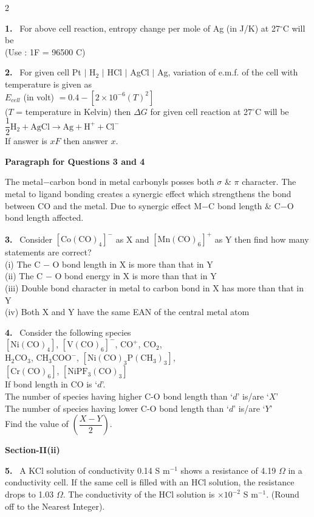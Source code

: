 \documentclass[10pt]{extarticle}
\newcommand{\sect}[1]{\par\smallskip\noindent\textbf{#1}\par}
\newcommand{\qn}[1]{\par\smallskip\noindent\textbf{#1.}~}
\newcommand{\paraq}[2]{\par\smallskip\noindent\textbf{Paragraph for Questions #1 and #2}\par}
\begin{document}
\begin{multicols}{2}
\qn{1} For above cell reaction, entropy change per mole of Ag (in J/K) at 27$^\circ$C will be\\
(Use : 1F = 96500 C)

\qn{2} For given cell Pt $|$ H$_2$ $|$ HCl $|$ AgCl $|$ Ag, variation of e.m.f. of the cell with temperature is given as\\
$E_{cell}$ (in volt) $=0.4-[2\times10^{-6}(T)^2]$\\
($T$ = temperature in Kelvin) then $\Delta G$ for given cell reaction at 27$^\circ$C will be\\
$\dfrac12\mathrm{H_2}+\mathrm{AgCl}\rightarrow\mathrm{Ag}+\mathrm{H^+}+\mathrm{Cl^-}$\\
If answer is $xF$ then answer $x$.

\paraq{3}{4}
The metal$-$carbon bond in metal carbonyls posses both $\sigma$ \& $\pi$ character. The metal to ligand bonding creates a synergic effect which strengthens the bond between CO and the metal. Due to synergic effect M$-$C bond length \& C$-$O bond length affected.

\qn{3} Consider $[\mathrm{Co(CO)_4}]^{-}$ as X and $[\mathrm{Mn(CO)_6}]^{+}$ as Y then find how many statements are correct?\\
(i) The C $-$ O bond length in X is more than that in Y\\
(ii) The C $-$ O bond energy in X is more than that in Y\\
(iii) Double bond character in metal to carbon bond in X has more than that in Y\\
(iv) Both X and Y have the same EAN of the central metal atom

\qn{4} Consider the following species\\
$[\mathrm{Ni(CO)_4}]$, $[\mathrm{V(CO)_6}]^{-}$, $\mathrm{CO^+}$, $\mathrm{CO_2}$,\\
$\mathrm{H_2CO_3}$, $\mathrm{CH_3COO^-}$, $[\mathrm{Ni(CO)_3P(CH_3)_3}]$,\\
$[\mathrm{Cr(CO)_6}]$, $[\mathrm{NiPF_3(CO)_3}]$\\
If bond length in CO is `$d$'.\\
The number of species having higher C-O bond length than `$d$' is/are `$X$'\\
The number of species having lower C-O bond length than `$d$' is/are `$Y$'\\
Find the value of $\left(\dfrac{X-Y}{2}\right)$.

\sect{Section-II(ii)}

\qn{5} A KCl solution of conductivity 0.14 S m$^{-1}$ shows a resistance of 4.19 $\Omega$ in a conductivity cell. If the same cell is filled with an HCl solution, the resistance drops to 1.03 $\Omega$. The conductivity of the HCl solution is \underline{\hspace{2em}}$\times10^{-2}$ S m$^{-1}$. (Round off to the Nearest Integer).


\end{multicols}
\end{document}
